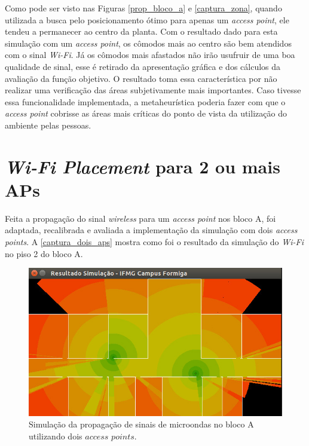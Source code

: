 \documentclass[
	12pt,				%
	twoside,			%
	a4paper,			%
	english,			%
	french,				%
	spanish,			%
	brazil				%
	]{abntex2}
\begin{document}
Como pode ser visto nas Figuras \ref{prop_bloco_a} e \ref{captura_zona},
quando utilizada a busca pelo posicionamento ótimo para apenas um
\emph{access point}, ele tendeu a permanecer ao centro da planta. Com o
resultado dado para esta simulação com um \emph{access point}, os
cômodos mais ao centro são bem atendidos com o sinal \emph{Wi-Fi}. Já os
cômodos mais afastados não irão usufruir de uma boa qualidade de sinal,
esse é retirado da apresentação gráfica e dos cálculos da avaliação da
função objetivo. O resultado toma essa característica por não realizar
uma verificação das áreas subjetivamente mais importantes. Caso tivesse
essa funcionalidade implementada, a metaheurística poderia fazer com que
o \emph{access point} cobrisse as áreas mais críticas do ponto de vista
da utilização do ambiente pelas pessoas.

\section{\texorpdfstring{\emph{Wi-Fi Placement} para 2 ou mais
APs}{Wi-Fi Placement para 2 ou mais APs}}\label{wi-fi-placement-para-2-ou-mais-aps}

Feita a propagação do sinal \emph{wireless} para um \emph{access point}
nos bloco A, foi adaptada, recalibrada e avaliada a implementação da
simulação com dois \emph{access points}. A \autoref{captura_dois_aps}
mostra como foi o resultado da simulação do \emph{Wi-Fi} no piso 2 do
bloco A.

\begin{figure}[!ht]
    \caption{\label{captura_dois_aps} Simulação da propagação de sinais de microondas no bloco A utilizando dois $access$ $points$.
    }
    \begin{center}
        \includegraphics[scale=0.6]{imagens/captura-2-aps-2.jpg}
    \end{center}
\end{figure}
\end{document}
